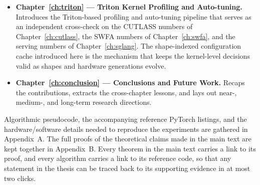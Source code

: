 \begin{itemize}
          speedup into the share contributed by each individual
          optimisation.
    \item \textbf{Chapter~\ref{ch:triton} --- Triton Kernel Profiling
          and Auto-tuning.} Introduces the Triton-based profiling
          and auto-tuning pipeline that serves as an independent
          cross-check on the CUTLASS numbers of
          Chapter~\ref{ch:cutlass}, the SWFA numbers of
          Chapter~\ref{ch:swfa}, and the serving numbers of
          Chapter~\ref{ch:sglang}. The shape-indexed configuration
          cache introduced here is the mechanism that keeps the
          kernel-level decisions valid as shapes and hardware
          generations evolve.
    \item \textbf{Chapter~\ref{ch:conclusion} --- Conclusions and
          Future Work.} Recaps the contributions, extracts the
          cross-chapter lessons, and lays out near-, medium-, and
          long-term research directions.
\end{itemize}

Algorithmic pseudocode, the accompanying reference PyTorch listings,
and the hardware/software details needed to reproduce the
experiments are gathered in Appendix~A. The full proofs of the
theoretical claims made in the main text are kept together in
Appendix~B. Every theorem in the main text carries a link to its
proof, and every algorithm carries a link to its reference code, so
that any statement in the thesis can be traced back to its
supporting evidence in at most two clicks.
